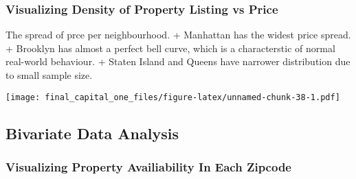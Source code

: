 \documentclass[
]{article}
\begin{document}
\hypertarget{visualizing-density-of-property-listing-vs-price}{%
\subsubsection{Visualizing Density of Property Listing vs
Price}\label{visualizing-density-of-property-listing-vs-price}}

The spread of prce per neighbourhood. + Manhattan has the widest price
spread. + Brooklyn has almost a perfect bell curve, which is a
characterstic of normal real-world behaviour. + Staten Island and Queens
have narrower distribution due to small sample size.

\texttt{[image: final\_capital\_one\_files/figure-latex/unnamed-chunk-38-1.pdf]}

\hypertarget{bivariate-data-analysis}{%
\subsection{Bivariate Data Analysis}\label{bivariate-data-analysis}}

\hypertarget{visualizing-property-availiability-in-each-zipcode}{%
\subsubsection{Visualizing Property Availiability In Each
Zipcode}\label{visualizing-property-availiability-in-each-zipcode}}
\end{document}
